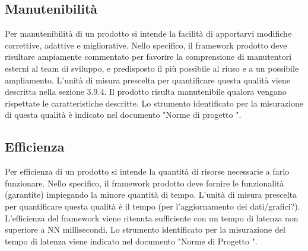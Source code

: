 	\subsection{Manutenibilità}
		Per manutenibilità di un prodotto si intende la facilità di apportarvi modifiche correttive, adattive e migliorative.
		Nello specifico, il framework prodotto deve risultare ampiamente commentato per favorire la comprensione di manutentori esterni al team di sviluppo, e predisposto il più possibile al riuso e a un possibile ampliamento.
		L'unità di misura prescelta per quantificare questa qualità viene descritta nella sezione 3.9.4. Il prodotto risulta manutenibile qualora vengano rispettate le caratteristiche descritte.
		Lo strumento identificato per la misurazione di questa qualità è indicato nel documento "Norme di progetto \lastversion".
	\subsection{Efficienza}
		Per efficienza di un prodotto si intende la quantità di risorse necessarie a farlo funzionare.
		Nello specifico, il framework prodotto deve fornire le funzionalità (garantite) impiegando la minore quantità di tempo.
		L'unità di misura prescelta per quantificare questa qualità è il tempo (per l'aggiornamento dei dati/grafici?). L'efficienza del framework viene ritenuta sufficiente con un tempo di latenza non superiore a NN millisecondi.
		Lo strumento identificato per la misurazione del tempo di latenza viene indicato nel documento "Norme di Progetto \lastversion".